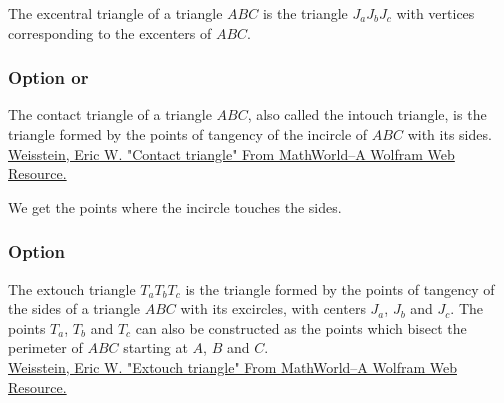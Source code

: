 The excentral triangle of a triangle $ABC$ is the triangle $J_aJ_bJ_c$ with vertices corresponding to the excenters of $ABC$.

\begin{tkzexample}[latex=7cm,small]
\end{tkzexample}


\subsubsection{Option  or }
The contact triangle of a triangle $ABC$, also called the intouch triangle, is the triangle formed by the points of tangency of the incircle of $ABC$ with its sides.\\
\href{http://mathworld.wolfram.com/ContactTriangle.html}{Weisstein, Eric W. "Contact triangle" From MathWorld--A Wolfram Web Resource.}

We get the points where the incircle touches the sides.
\begin{tkzexample}[latex=7cm,small]
\end{tkzexample}

\subsubsection{Option }
The extouch triangle $T_aT_bT_c$ is the triangle formed by the points of tangency of the sides of a triangle $ABC$ with its excircles, with centers $J_a$, $J_b$ and $J_c$. The points $T_a$, $T_b$ and $T_c$ can also be constructed as the points which bisect the perimeter of $ABC$ starting at $A$, $B$ and $C$.\\
\href{http://mathworld.wolfram.com/ExtouchTriangle.html}{Weisstein, Eric W. "Extouch triangle" From MathWorld--A Wolfram Web Resource.}

